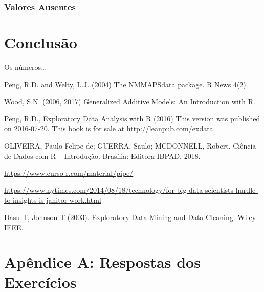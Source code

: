\documentclass[]{book}
\begin{document}
\hypertarget{valores-ausentes}{%
\subsection{Valores Ausentes}\label{valores-ausentes}}

\hypertarget{summary}{%
\chapter{Conclusão}\label{summary}}

Os números\ldots{}

Peng, R.D. and Welty, L.J. (2004) The NMMAPSdata package. R News 4(2).

Wood, S.N. (2006, 2017) Generalized Additive Models: An Introduction with R.

Peng, R.D., Exploratory Data Analysis with R (2016) This version was published on 2016-07-20. This book is for sale at \url{http://leanpub.com/exdata}

OLIVEIRA, Paulo Felipe de; GUERRA, Saulo; MCDONNELL, Robert. Ciência de Dados com R -- Introdução. Brasília: Editora IBPAD, 2018.

\url{https://www.curso-r.com/material/pipe/}

\url{https://www.nytimes.com/2014/08/18/technology/for-big-data-scientists-hurdle-to-insights-is-janitor-work.html}

Dasu T, Johnson T (2003). Exploratory Data Mining and Data Cleaning. Wiley-IEEE.

\hypertarget{apendice-a-respostas-dos-exercicios}{%
\chapter*{Apêndice A: Respostas dos Exercícios}\label{apendice-a-respostas-dos-exercicios}}


\end{document}
